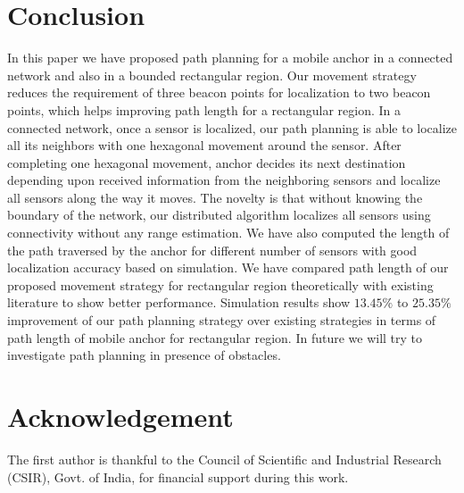 \documentclass[preprint,11pt]{elsarticle}
\begin{document}
\section{Conclusion}
In this paper we have proposed path planning for a mobile anchor in a connected network and also in a bounded rectangular region.
Our movement strategy reduces the requirement of three beacon points for localization to two beacon points, which helps improving
path length for a rectangular region.
In a connected network, once a sensor is localized, our path planning is able to localize all its neighbors
with one hexagonal movement around the sensor. After completing one hexagonal movement, anchor decides its next
destination depending upon received information from the neighboring sensors and localize all sensors along
the way it moves. The novelty is that without knowing the boundary of the network,
our distributed algorithm localizes all sensors using connectivity without any range estimation.
We have also computed the length of the path traversed by the anchor for different number of sensors with good
localization accuracy based on simulation.
We have compared path length of our proposed movement strategy for rectangular region theoretically with existing
literature to show better performance. Simulation results show $13.45 \%$ to $25.35 \%$ improvement of our path
planning strategy over existing strategies in terms of path length of mobile anchor for rectangular region.
In future we will try to investigate path planning in presence of obstacles.
\label{sec:conclusion}

\section*{Acknowledgement}
The first author is thankful to the Council of Scientific and Industrial Research (CSIR), Govt. of India,
for financial support during this work.



\end{document}

